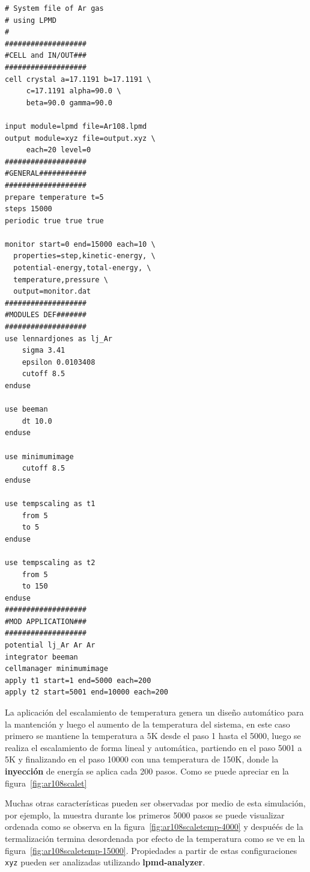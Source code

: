 \begin{multicols}{2}
\setlength{\columnseprule}{.5pt}
\begin{verbatim}
# System file of Ar gas 
# using LPMD
#
###################
#CELL and IN/OUT###
###################
cell crystal a=17.1191 b=17.1191 \
     c=17.1191 alpha=90.0 \
     beta=90.0 gamma=90.0

input module=lpmd file=Ar108.lpmd
output module=xyz file=output.xyz \
     each=20 level=0
###################
#GENERAL###########
###################
prepare temperature t=5
steps 15000
periodic true true true

monitor start=0 end=15000 each=10 \
  properties=step,kinetic-energy, \
  potential-energy,total-energy, \
  temperature,pressure \
  output=monitor.dat
###################
#MODULES DEF#######
###################
use lennardjones as lj_Ar
    sigma 3.41
    epsilon 0.0103408
    cutoff 8.5
enduse

use beeman
    dt 10.0
enduse

use minimumimage
    cutoff 8.5
enduse

use tempscaling as t1
    from 5
    to 5
enduse

use tempscaling as t2
    from 5
    to 150
enduse
###################
#MOD APPLICATION###
###################
potential lj_Ar Ar Ar
integrator beeman
cellmanager minimumimage
apply t1 start=1 end=5000 each=200
apply t2 start=5001 end=10000 each=200
\end{verbatim}
\end{multicols}

La aplicaci\'on del escalamiento de temperatura genera un dise\~no autom\'atico para la mantenci\'on y luego el aumento de la temperatura del sistema, en este caso primero se mantiene la temperatura a 5K desde el paso 1 hasta el 5000, luego se realiza el escalamiento de forma lineal y autom\'atica, partiendo en el paso 5001 a 5K y finalizando en el paso 10000 con una temperatura de 150K, donde la \textbf{inyecci\'on} de energ\'ia se aplica cada 200 pasos. Como se puede apreciar en la figura~\ref{fig:ar108scalet}


Muchas otras caracter\'isticas pueden ser observadas por medio de esta simulaci\'on, por ejemplo, la muestra durante los primeros 5000 pasos se puede visualizar ordenada como se observa en la figura~\ref{fig:ar108scaletemp-4000} y despué\'es de la termalizaci\'on termina desordenada por efecto de la temperatura como se ve en la figura~\ref{fig:ar108scaletemp-15000}. Propiedades a partir de estas configuraciones \verb|xyz| pueden ser analizadas utilizando \textbf{lpmd-analyzer}.

